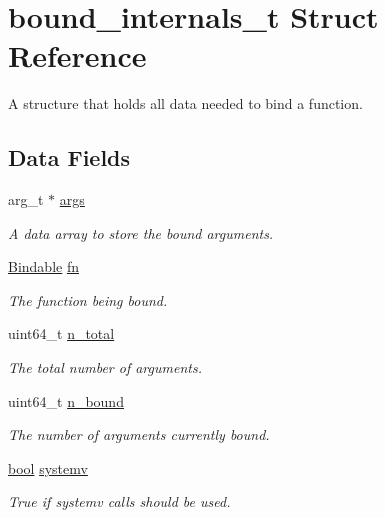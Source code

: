 \hypertarget{structbound__internals__t}{}\section{bound\+\_\+internals\+\_\+t Struct Reference}
\label{structbound__internals__t}


A structure that holds all data needed to bind a function.  


\subsection*{Data Fields}
\begin{DoxyCompactItemize}
\item 
arg\+\_\+t $\ast$ \hyperlink{structbound__internals__t_a84757175e6e08d7364e8aad728e49985}{args}
\begin{DoxyCompactList}\small\item\em A data array to store the bound arguments. \end{DoxyCompactList}\item 
\hyperlink{bind_8h_a8fdbf6bcbe597219692d8bd8952b9839}{Bindable} \hyperlink{structbound__internals__t_ac9b29b4f9b69674cef9fb3d083b92521}{fn}
\begin{DoxyCompactList}\small\item\em The function being bound. \end{DoxyCompactList}\item 
uint64\+\_\+t \hyperlink{structbound__internals__t_a804e2e3c6b4c0ca1814c6884ed0bd161}{n\+\_\+total}
\begin{DoxyCompactList}\small\item\em The total number of arguments. \end{DoxyCompactList}\item 
uint64\+\_\+t \hyperlink{structbound__internals__t_aa959691320a507b149ff25164740a323}{n\+\_\+bound}
\begin{DoxyCompactList}\small\item\em The number of arguments currently bound. \end{DoxyCompactList}\item 
\hyperlink{bind_8c_af6a258d8f3ee5206d682d799316314b1}{bool} \hyperlink{structbound__internals__t_af4af2491e60d6cda5a3bde0091d8b5c0}{systemv}
\begin{DoxyCompactList}\small\item\em True if systemv calls should be used. \end{DoxyCompactList}\end{DoxyCompactItemize}


